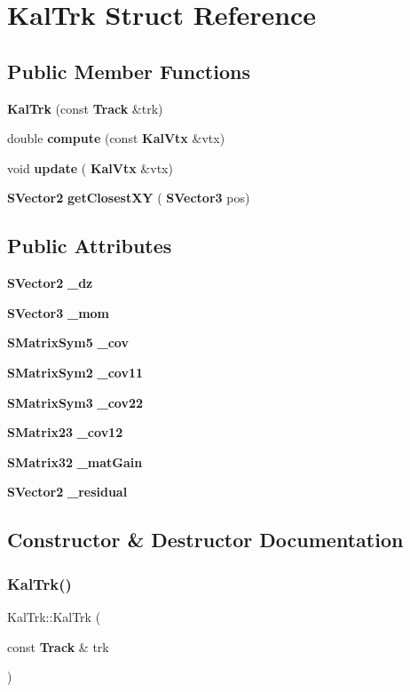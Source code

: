 \section{Kal\+Trk Struct Reference}
\label{structKalTrk}
\subsection*{Public Member Functions}
\begin{DoxyCompactItemize}
\item 
\textbf{ Kal\+Trk} (const \textbf{ Track} \&trk)
\item 
double \textbf{ compute} (const \textbf{ Kal\+Vtx} \&vtx)
\item 
void \textbf{ update} (\textbf{ Kal\+Vtx} \&vtx)
\item 
\textbf{ S\+Vector2} \textbf{ get\+Closest\+XY} (\textbf{ S\+Vector3} pos)
\end{DoxyCompactItemize}
\subsection*{Public Attributes}
\begin{DoxyCompactItemize}
\item 
\textbf{ S\+Vector2} \textbf{ \+\_\+dz}
\item 
\textbf{ S\+Vector3} \textbf{ \+\_\+mom}
\item 
\textbf{ S\+Matrix\+Sym5} \textbf{ \+\_\+cov}
\item 
\textbf{ S\+Matrix\+Sym2} \textbf{ \+\_\+cov11}
\item 
\textbf{ S\+Matrix\+Sym3} \textbf{ \+\_\+cov22}
\item 
\textbf{ S\+Matrix23} \textbf{ \+\_\+cov12}
\item 
\textbf{ S\+Matrix32} \textbf{ \+\_\+mat\+Gain}
\item 
\textbf{ S\+Vector2} \textbf{ \+\_\+residual}
\end{DoxyCompactItemize}


\subsection{Constructor \& Destructor Documentation}
\mbox{\label{structKalTrk_ac3b66be7eccb2fb85458923ed8c7303a}} 
\subsubsection{Kal\+Trk()}
{\footnotesize\ttfamily Kal\+Trk\+::\+Kal\+Trk (\begin{DoxyParamCaption}\item[{const \textbf{ Track} \&}]{trk }\end{DoxyParamCaption})\hspace{0.3cm}{\ttfamily [inline]}}



